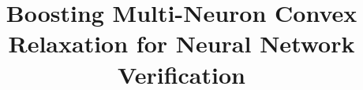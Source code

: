\documentclass[runningheads]{llncs}
\begin{document}
%
\title{Boosting Multi-Neuron Convex Relaxation for Neural Network Verification
}
%
%
%
\maketitle              %
%
\end{document}
